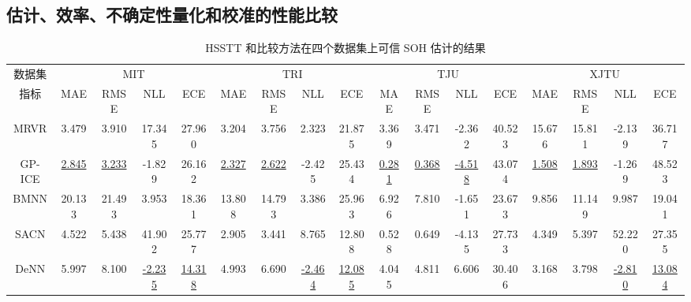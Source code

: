 \documentclass[UTF8,journal,twoside,web]{ieeecolor}
\begin{document}
\subsection{估计、效率、不确定性量化和校准的性能比较}\label{subsec:comparison}

\begin{table}[htbp]
  \centering
  \caption{HSSTT 和比较方法在四个数据集上可信 SOH 估计的结果}
  \scalebox{0.8}
    {
      \small
      \begin{adjustbox}{center}{
  \begin{threeparttable}
    
      \begin{tabular}{ccccccccccccccccc}
    \toprule
    数据集 & \multicolumn{4}{c}{MIT}       & \multicolumn{4}{c}{TRI}       & \multicolumn{4}{c}{TJU} & \multicolumn{4}{c}{{XJTU}} \\
\cmidrule{2-17}    指标 & MAE   & RMSE  & NLL   & ECE   & MAE   & RMSE  & NLL   & ECE   & MAE   & RMSE  & NLL   & ECE & {MAE}   & {RMSE}  & {NLL}   & {ECE}  \\
    \midrule
    MRVR\cite{rvr_rul_9552552}  & 3.479  & 3.910  & 17.345  & 27.960  & 3.204  & 3.756  & 2.323  & 21.875  & 3.369  & 3.471  & -2.362  & 40.523 & {15.676} & {15.811} & {-2.139} & {36.717}  \\
    GP-ICE\cite{gpr_soh_8263147} & \underline{2.845}  & \underline{3.233}  & -1.829  & 26.162  & \underline{2.327}  & \underline{2.622}  & -2.425  & 25.434  & \underline{0.281}  & \underline{0.368}  & \underline{-4.518}  & 43.074 & {\underline{1.508}} & {\underline{1.893}} & {-1.269} & {48.523}  \\
    BMNN\cite{bbb_rul_9738999}  & 20.133  & 21.493  & 3.953  & 18.361  & 13.808  & 14.793  & 3.386  & 25.963  & 6.926  & 7.810  & -1.651  & 23.673 & {9.856} & {11.149} & {9.987} & {19.041}  \\
    SACN\cite{capsnet_rul_li2024sensor}  & 4.522  & 5.438  & 41.902  & 25.777  & 2.905  & 3.441  & 8.765  & 12.808  & 0.528  & 0.649  & -4.135  & 27.733 & {4.349} & {5.397} & {52.220} & {27.355}  \\
    DeNN\cite{ensemble2_soh_10102497}  & 5.997  & 8.100  & \underline{-2.235} & \underline{14.318}  & 4.993  & 6.690  & \underline{-2.464}  & \underline{12.085}  & 4.045  & 4.811  & 6.606  & 30.406 & {3.168} & {3.798} & {\underline{-2.810}} & {\underline{13.084}}  \\

\end{tabular}
\end{threeparttable}}
\end{adjustbox}}
\end{table}
\end{document}
